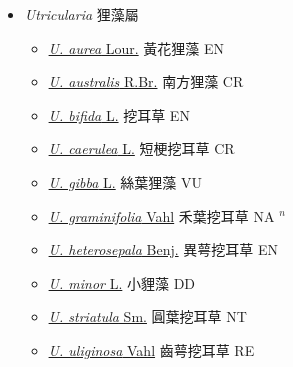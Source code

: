 
  \begin{itemize}
 \item[] \textit{Utricularia} 狸藻屬
                    
  \begin{itemize}
        \item[] \href{http://www.theplantlist.org/tpl1.1/search?q=Utricularia+aurea}{\textit{U. aurea} Lour.}   黃花狸藻 EN
        \item[] \href{http://www.theplantlist.org/tpl1.1/search?q=Utricularia+australis}{\textit{U. australis} R.Br.}   南方狸藻 CR
        \item[] \href{http://www.theplantlist.org/tpl1.1/search?q=Utricularia+bifida}{\textit{U. bifida} L.}   挖耳草 EN
        \item[] \href{http://www.theplantlist.org/tpl1.1/search?q=Utricularia+caerulea}{\textit{U. caerulea} L.}   短梗挖耳草 CR
        \item[] \href{http://www.theplantlist.org/tpl1.1/search?q=Utricularia+gibba}{\textit{U. gibba} L.}   絲葉狸藻 VU
        \item[] \href{http://www.theplantlist.org/tpl1.1/search?q=Utricularia+graminifolia}{\textit{U. graminifolia} Vahl}   禾葉挖耳草 NA $^n$
        \item[] \href{http://www.theplantlist.org/tpl1.1/search?q=Utricularia+heterosepala}{\textit{U. heterosepala} Benj.}   異萼挖耳草 EN
        \item[] \href{http://www.theplantlist.org/tpl1.1/search?q=Utricularia+minor}{\textit{U. minor} L.}   小貍藻 DD
        \item[] \href{http://www.theplantlist.org/tpl1.1/search?q=Utricularia+striatula}{\textit{U. striatula} Sm.}   圓葉挖耳草 NT
        \item[] \href{http://www.theplantlist.org/tpl1.1/search?q=Utricularia+uliginosa}{\textit{U. uliginosa} Vahl}   齒萼挖耳草 RE
  \end{itemize}
  \end{itemize}
